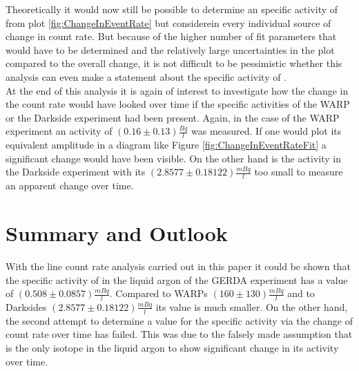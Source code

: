 \documentclass[encoding=utf8,british]{tumphthesis}
\begin{document}
Theoretically it would now still be possible to determine an specific activity of \Kr from plot \ref{fig:ChangeInEventRate} but considerein every individual source of change in count rate.
But because of the higher number of fit parameters that would have to be determined and the relatively large uncertainties in the plot compared to the overall change, it is not difficult to be pessimistic whether this analysis can even make a statement about the specific activity of \Kr.
\\

At the end of this analysis it is again of interest to investigate how the change in the count rate would have looked over time if the specific activities of the WARP or the Darkside experiment had been present.
Again, in the case of the WARP experiment an activity of $(0.16\pm0.13)\frac{\unit{Bq}}{\unit{l}}$ was measured. 
If one would plot its equivalent amplitude in a diagram like Figure \ref{fig:ChangeInEventRateFit} a significant change would have been visible.
On the other hand is the activity in the Darkside experiment with its $(2.8577 \pm 0.18122) \frac{\unit{mBq}}{\unit{l}}$ too small to measure an apparent change over time.
\\



\chapter{Summary and Outlook}
\label{sec:ConcAndOutlook}

With the line count rate analysis carried out in this paper it could be shown that the specific activity of  in the liquid argon of the GERDA experiment has a value of $(0.508\pm0.0857) \frac{\unit{mBq}}{\unit{l}}$. 
Compared to WARPs $(160\pm130)\frac{\unit{mBq}}{\unit{l}}$ and to Darksides $(2.8577 \pm 0.18122) \frac{\unit{mBq}}{\unit{l}}$ its value is much smaller.
On the other hand, the second attempt to determine a value for the specific activity via the change of count rate over time has failed.
This was due to the falsely made assumption that \Kr is the only isotope in the liquid argon to show significant change in its activity over time.
\\
\end{document}
